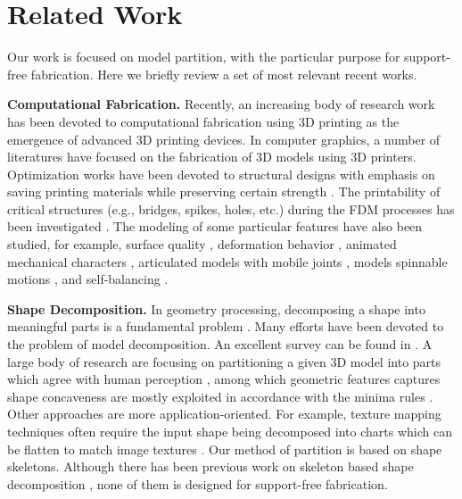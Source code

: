 \section{Related Work}

Our work is focused on model partition, with the particular purpose for support-free fabrication. Here we briefly review a set of most relevant recent works.

\textbf{Computational Fabrication.} Recently, an increasing body of research work has been devoted to computational fabrication using 3{D} printing as the emergence of advanced 3{D} printing devices. In computer graphics, a number of literatures have focused on the fabrication of 3{D} models using 3{D} printers. Optimization works have been devoted to structural designs with emphasis on saving printing materials while preserving certain strength \cite{StavaVBCM12,ZhouPZ13,WangWYLTTDCL13,Umetani:2013:CSA,wang2013cost,LuSZWFCSTCC14,hornus2015tight,xie2017support}. The printability of critical structures (e.g., bridges, spikes, holes, etc.) during the FDM processes has been investigated \cite{telea2011voxel,DumasHL14}. The modeling of some particular features have also been studied, for example, surface quality \cite{wang2016improved}, deformation behavior \cite{SkourasTCBG13}, animated mechanical characters \cite{CorosTNSFSMB13,CeylanLMAP13}, articulated models with mobile joints \cite{BacherBJP12,CaliCAKSKW12}, models spinnable motions \cite{Bacher14}, and self-balancing \cite{PrevostWLS13}.

\textbf{Shape Decomposition.} In geometry processing, decomposing a shape into meaningful parts is a fundamental problem \cite{Kaick:2014:SSA}. Many efforts have been devoted to the problem of model decomposition. An excellent survey can be found in \cite{Shamir08}. A large body of research are focusing on partitioning a given 3{D} model into parts which agree with human perception \cite{KatzT03,KatzLT05,JiLCW06,LiuZ07,Golovinskiy:2008,ChenGF09,KaickFKAC14}, among which geometric features captures shape concaveness are mostly exploited in accordance with the minima rules \cite{hoffman1984parts,hoffman1997salience}. Other approaches are more application-oriented. For example, texture mapping techniques often require the input shape being decomposed into charts which can be flatten to match image textures \cite{zhou2004iso,Garcia:2008:IIG}. Our method of partition is based on shape skeletons. Although there has been previous work on skeleton based shape decomposition \cite{lien2006simultaneous,reniers2007skeleton,AuTCCL08}, none of them is designed for support-free fabrication.


